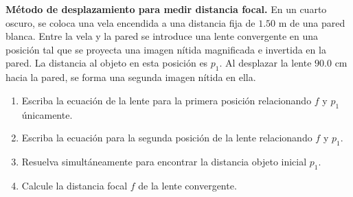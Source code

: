 \item \textbf{Método de desplazamiento para medir distancia focal.}
En un cuarto oscuro, se coloca una vela encendida a una distancia fija de $1.50\text{ m}$ de una pared blanca. Entre la vela y la pared se introduce una lente convergente en una posición tal que se proyecta una imagen nítida magnificada e invertida en la pared. La distancia al objeto en esta posición es $p_1$. Al desplazar la lente $90.0\text{ cm}$ hacia la pared, se forma una segunda imagen nítida en ella.
\begin{enumerate}
    \item Escriba la ecuación de la lente para la primera posición relacionando $f$ y $p_1$ únicamente.
    \item Escriba la ecuación para la segunda posición de la lente relacionando $f$ y $p_1$.
    \item Resuelva simultáneamente para encontrar la distancia objeto inicial $p_1$.
    \item Calcule la distancia focal $f$ de la lente convergente.
\end{enumerate}